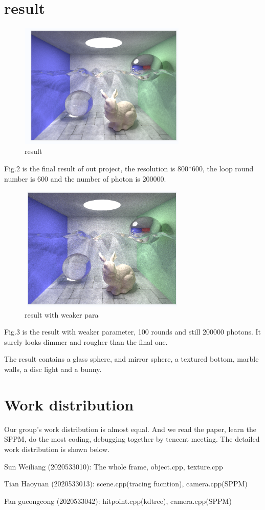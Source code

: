 \documentclass[acmtog]{acmart}
\begin{document}
\section{result}
\begin{figure}[h]
	\includegraphics[width=8cm,height=6cm]{result.png}
	\caption{result}
\end{figure}
Fig.2 is the final result of out project, the resolution is 800*600, the loop round number is 600 and the number of photon is 200000.
\begin{figure}[h]
	\includegraphics[width=8cm,height=6cm]{result100.png}
	\caption{result with weaker para}
\end{figure}

Fig.3 is the result with weaker parameter, 100 rounds and still 200000 photons. It surely looks dimmer and rougher than the final one.

The result contains a glass sphere, and mirror sphere, a textured bottom, marble walls, a disc light and a bunny.


\section{Work distribution} 

Our group's work distribution is almost equal. And we read the paper, learn the SPPM, do the most coding, debugging together by tencent meeting.
The detailed work distribution is shown below.

Sun Weiliang (2020533010): The whole frame, object.cpp, texture.cpp

Tian Haoyuan (2020533013): scene.cpp(tracing fucntion), camera.cpp(SPPM)

Fan gucongcong (2020533042): hitpoint.cpp(kdtree), camera.cpp(SPPM)
\end{document}
